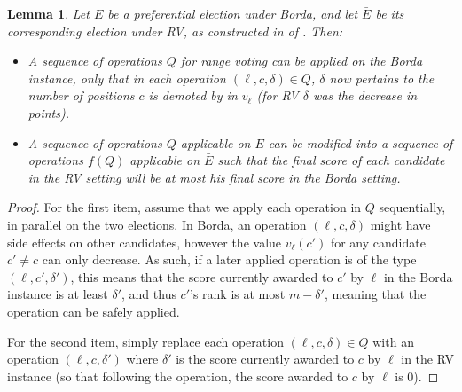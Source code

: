 \documentclass[letterpaper]{article} %
\newtheorem{lemma}{Lemma}
\begin{document}
\begin{lemma}\label{lem:corresponding}
Let $E$ be a preferential election under Borda, and let $\bar{E}$ be its corresponding election under RV, as constructed in  of . Then:
\begin{itemize}
    \item A sequence of operations $Q$ for range voting can be applied on the Borda instance, only that in each operation $(\ell, c, \delta) \in Q$, $\delta$ now pertains to the number of positions $c$ is demoted by in $v_\ell$ (for  RV $\delta$ was the decrease in points).
    \item A sequence of operations $Q$ applicable on $E$ can be modified into a sequence of operations $f(Q)$  applicable on $\bar{E}$ such that the final score of each candidate in the RV setting will be at most his final score in the Borda setting.
\end{itemize}
\end{lemma}
\begin{proof}
For the first item, assume that we apply each operation in $Q$ sequentially, in parallel on the two elections. In Borda, an operation $(\ell, c, \delta)$ might have side effects on other candidates, however the value $v_{\ell}(c')$ for any  candidate $c' \neq c$ can only decrease. As such, if a later applied operation is of the type $(\ell, c' ,\delta')$, this means that the score currently awarded to $c'$ by $\ell$ in the Borda instance is at least $\delta'$, and thus $c'$'s rank is at most $m-\delta'$, meaning that the operation can be safely applied.

For the second item, simply replace each  operation $(\ell, c, \delta) \in Q$ with an operation $(\ell,c,\delta')$ where $\delta'$ is the score currently awarded to $c$ by $\ell$ in the RV instance (so that following the operation, the score  awarded to $c$ by $\ell$ is $0$).
\end{proof}
\end{document}
